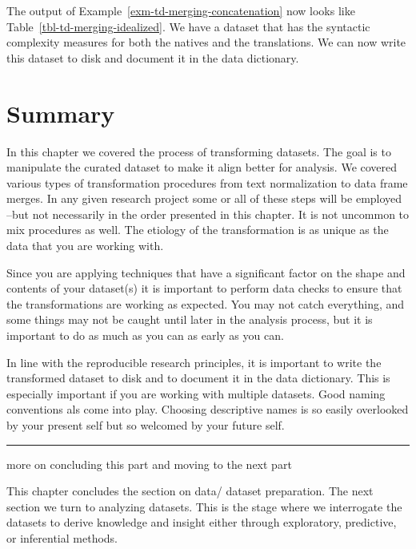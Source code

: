 \documentclass[
  letterpaper,
  DIV=11,
  numbers=noendperiod]{scrreport}
\theoremstyle{definition}
\theoremstyle{remark}
\begin{document}
The output of Example~\ref{exm-td-merging-concatenation} now looks like
Table~\ref{tbl-td-merging-idealized}. We have a dataset that has the
syntactic complexity measures for both the natives and the translations.
We can now write this dataset to disk and document it in the data
dictionary.

\hypertarget{summary-6}{%
\section*{Summary}\label{summary-6}}


In this chapter we covered the process of transforming datasets. The
goal is to manipulate the curated dataset to make it align better for
analysis. We covered various types of transformation procedures from
text normalization to data frame merges. In any given research project
some or all of these steps will be employed --but not necessarily in the
order presented in this chapter. It is not uncommon to mix procedures as
well. The etiology of the transformation is as unique as the data that
you are working with.

Since you are applying techniques that have a significant factor on the
shape and contents of your dataset(s) it is important to perform data
checks to ensure that the transformations are working as expected. You
may not catch everything, and some things may not be caught until later
in the analysis process, but it is important to do as much as you can as
early as you can.

In line with the reproducible research principles, it is important to
write the transformed dataset to disk and to document it in the data
dictionary. This is especially important if you are working with
multiple datasets. Good naming conventions als come into play. Choosing
descriptive names is so easily overlooked by your present self but so
welcomed by your future self.

\begin{center}\rule{0.5\linewidth}{0.5pt}\end{center}

 more on concluding this part and moving to the next part

This chapter concludes the section on data/ dataset preparation. The
next section we turn to analyzing datasets. This is the stage where we
interrogate the datasets to derive knowledge and insight either through
exploratory, predictive, or inferential methods.
\end{document}
